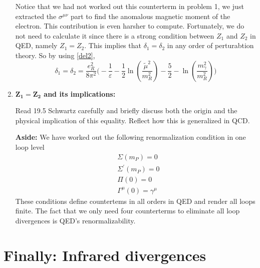 \documentclass[11pt]{article}
\begin{document}
\begin{enumerate}
\begin{problem}{\points{-}}
	Notice that we had not worked out this counterterm in problem 1, we just extracted the $\sigma^{\mu\nu}$ part to find the anomalous magnetic moment of the electron. This contribution is even harsher to compute. Fortunately, we do not need to calculate it since there is a strong condition between $Z_1$ and $Z_2$ in QED, namely $Z_1 = Z_2$. This implies that $\delta_1 = \delta_2$ in any order of perturabtion theory. 
	So by using \eqref{del2},
	\[
	\delta_1 = \delta_2 = \frac{e^2_R}{8\pi^2} \Big(
	-\frac{1}{\varepsilon} -\frac12 \ln(\frac{\tilde{\mu}^2}{m^2_R}) - \frac52 - \ln(\frac{m^2_\gamma}{m^2_R})
	\Big)
	\]
		
		\end{problem}
	
	
			\item
	\begin{problem}{\points{-}}
		\textbf{$\mathbf{Z_1 = Z_2}$ and its implications:}
		
		Read 19.5 Schwartz carefully and briefly discuss both the origin and the physical implication of this equality. Reflect how this is generalized in QCD. 
		
	\end{problem}
	
	\textbf{Aside:}
	We have worked out the following renormalization condition in one loop level
	\begin{equation*}
		\begin{aligned}
			&\Sigma(m_P) = 0 \\ &
			{\Sigma}^{'} (m_P) = 0 \\ &
			\Pi(0)=0 \\ &
			\Gamma^\mu(0)  = \gamma^\mu
		\end{aligned}
	\end{equation*}
	These conditions define countertems in all orders in QED and render all loops finite. The fact that we only need four counterterms to eliminate all loop divergences is QED's renormalizability. 
	\end{enumerate}
\newpage
\section*{Finally: Infrared divergences}
\end{document}

